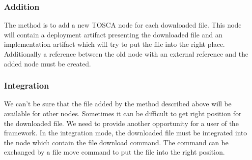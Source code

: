 \subsubsection*{Addition}
The method is to add a new TOSCA node for each downloaded file.
This node will contain a deployment artifact presenting the downloaded file and an implementation artifact which will try to put the file into the right place.
Additionally a reference between the old node with an external reference and the added node must be created.

\subsubsection{Integration}
We can't be sure that the file added by the method described above will be available for other nodes.
Sometimes it can be difficult to get right position for the downloaded file. %
We need to provide another opportunity for a user of the framework.
In the integration mode, the downloaded file must be integrated into the node which contain the file download command.
The command can be exchanged by a file move command to put the file into the right position.

